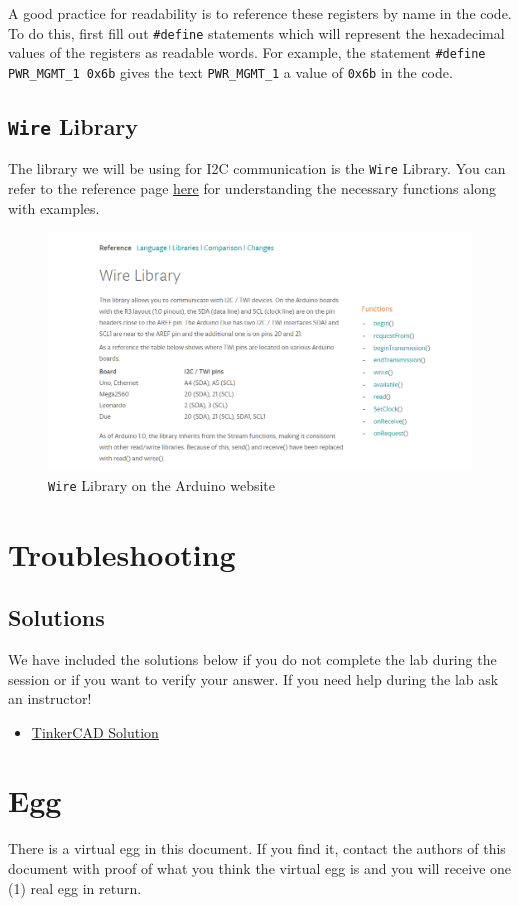\documentclass{article}
\begin{document}
        A good practice for readability is to reference these registers by name in the code. To do this, first fill out \texttt{\#define} statements which will represent the hexadecimal values of the registers as readable words. For example, the statement \texttt{\#define PWR\_MGMT\_1 0x6b} gives the text \texttt{PWR\_MGMT\_1} a value of \texttt{0x6b} in the code.  
        
    \subsection{\texttt{Wire} Library}
        The library we will be using for I2C communication is the \texttt{Wire} Library. You can refer to the reference page \href{https://www.arduino.cc/en/reference/wire}{here} for understanding the necessary functions along with examples.
        
        \begin{figure}[ht]
            \centering
            \includegraphics[width = 1.0\textwidth]{img/WireLibrary.PNG}
            \caption{\texttt{Wire} Library on the Arduino website}
        \end{figure}
        
\section{Troubleshooting}
    \subsection{Solutions}
    We have included the solutions below if you do not complete the lab during the session or if you want to verify your answer. If you need help during the lab ask an instructor!
\begin{itemize}
    \item \href{https://www.tinkercad.com/things/lFJojnkgwTw}{TinkerCAD Solution}
    \end{itemize}
    
    \section{Egg}
    There is a virtual egg in this document. If you find it, contact the authors of this document with proof of what you think the virtual egg is and you will receive one (1) real egg in return. 
\end{document}
